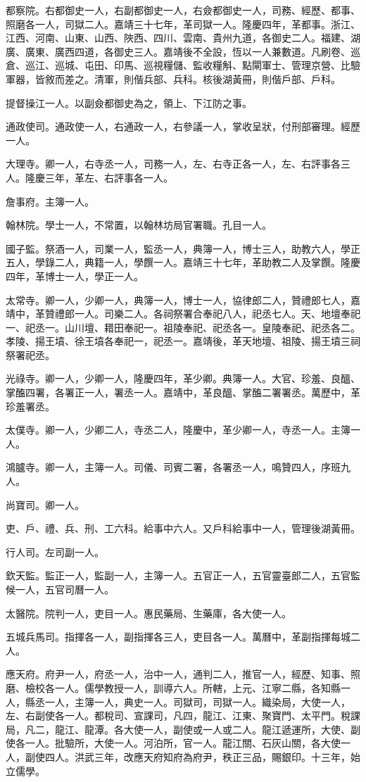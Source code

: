 都察院。右都御史一人，右副都御史一人，右僉都御史一人，司務、經歷、都事、照磨各一人，司獄二人。嘉靖三十七年，革司獄一人。隆慶四年，革都事。浙江、江西、河南、山東、山西、陜西、四川、雲南、貴州九道，各御史二人。福建、湖廣、廣東、廣西四道，各御史三人。嘉靖後不全設，恆以一人兼數道。凡刷卷、巡倉、巡江、巡城、屯田、印馬、巡視糧儲、監收糧斛、點閘軍士、管理京營、比驗軍器，皆敘而差之。清軍，則偕兵部、兵科。核後湖黃冊，則偕戶部、戶科。

提督操江一人。以副僉都御史為之，領上、下江防之事。

通政使司。通政使一人，右通政一人，右參議一人，掌收呈狀，付刑部審理。經歷一人。

大理寺。卿一人，右寺丞一人，司務一人，左、右寺正各一人，左、右評事各三人。隆慶三年，革左、右評事各一人。

詹事府。主簿一人。

翰林院。學士一人，不常置，以翰林坊局官署職。孔目一人。

國子監。祭酒一人，司業一人，監丞一人，典簿一人，博士三人，助教六人，學正五人，學錄二人，典籍一人，學饌一人。嘉靖三十七年，革助教二人及掌饌。隆慶四年，革博士一人，學正一人。

太常寺。卿一人，少卿一人，典簿一人，博士一人，協律郎二人，贊禮郎七人，嘉靖中，革贊禮郎一人。司樂二人。各祠祭署合奉祀八人，祀丞七人。天、地壇奉祀一、祀丞一。山川壇、耤田奉祀一。祖陵奉祀、祀丞各一。皇陵奉祀、祀丞各二。孝陵、揚王墳、徐王墳各奉祀一，祀丞一。嘉靖後，革天地壇、祖陵、揚王墳三祠祭署祀丞。

光祿寺。卿一人，少卿一人，隆慶四年，革少卿。典簿一人。大官、珍羞、良醞、掌醢四署，各署正一人，署丞一人。嘉靖中，革良醞、掌醢二署署丞。萬歷中，革珍羞署丞。

太僕寺。卿一人，少卿二人，寺丞二人，隆慶中，革少卿一人，寺丞一人。主簿一人。

鴻臚寺。卿一人，主簿一人。司儀、司賓二署，各署丞一人，鳴贊四人，序班九人。

尚寶司。卿一人。

吏、戶、禮、兵、刑、工六科。給事中六人。又戶科給事中一人，管理後湖黃冊。

行人司。左司副一人。

欽天監。監正一人，監副一人，主簿一人。五官正一人，五官靈臺郎二人，五官監候一人，五官司曆一人。

太醫院。院判一人，吏目一人。惠民藥局、生藥庫，各大使一人。

五城兵馬司。指揮各一人，副指揮各三人，吏目各一人。萬曆中，革副指揮每城二人。

應天府。府尹一人，府丞一人，治中一人，通判二人，推官一人，經歷、知事、照磨、檢校各一人。儒學教授一人，訓導六人。所轄，上元、江寧二縣，各知縣一人，縣丞一人，主簿一人，典史一人。司獄司，司獄一人。織染局，大使一人，左、右副使各一人。都稅司、宣課司，凡四，龍江、江東、聚寶門、太平門。稅課局，凡二，龍江、龍潭。各大使一人，副使或一人或二人。龍江遞運所，大使、副使各一人。批驗所，大使一人。河泊所，官一人。龍江關、石灰山關，各大使一人，副使四人。洪武三年，改應天府知府為府尹，秩正三品，賜銀印。十三年，始立儒學。

